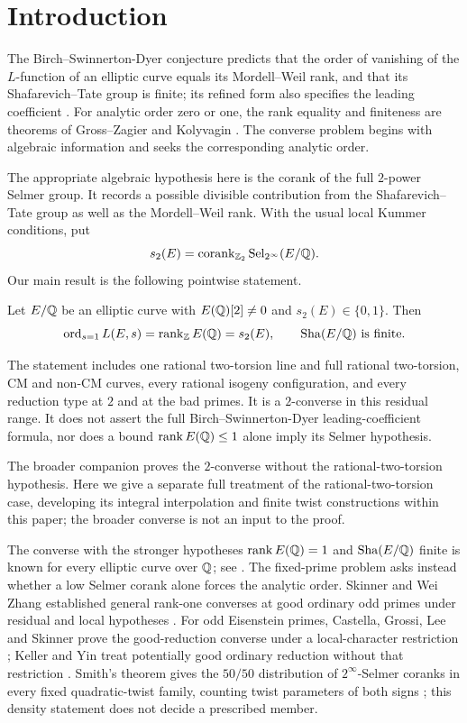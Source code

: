 \section{Introduction}\label{sec:introduction}

The Birch--Swinnerton-Dyer conjecture predicts that the order of vanishing
of the $L$-function of an elliptic curve equals its Mordell--Weil rank,
and that its Shafarevich--Tate group is finite; its refined form also
specifies the leading coefficient \cite{BirchSwinnertonDyer1965,Tate1966}.
For analytic order zero or one, the rank equality and finiteness are
theorems of Gross--Zagier and Kolyvagin
\cite{GrossZagier1986,Kolyvagin1990}.
The converse problem begins with algebraic information and seeks the
corresponding analytic order.

The appropriate algebraic hypothesis here is the corank of the full
$2$-power Selmer group. It records a possible divisible contribution
from the Shafarevich--Tate group as well as the Mordell--Weil rank.
With the usual local Kummer conditions, put
\[
s_2(E)=\operatorname{corank}_{\mathbb Z_2}\operatorname{Sel}_{2^\infty}(E/\mathbb Q).
\]
Our main result is the following pointwise statement.

\begin{theorem}\label{thm:main}
Let $E/\mathbb Q$ be an elliptic curve with $E(\mathbb Q)[2]\ne0$ and
$s_2(E)\in\{0,1\}$. Then
\[
\operatorname{ord}_{s=1}L(E,s)=\operatorname{rank}_{\mathbb Z}E(\mathbb Q)=s_2(E),
\qquad
\operatorname{Sha}(E/\mathbb Q)\text{ is finite}.
\]
\end{theorem}

The statement includes one rational two-torsion line and full rational
two-torsion, CM and non-CM curves, every rational isogeny configuration,
and every reduction type at $2$ and at the bad primes. It is a
$2$-converse in this residual range. It does not assert the full
Birch--Swinnerton-Dyer leading-coefficient formula, nor does a bound
$\operatorname{rank} E(\mathbb Q)\le1$ alone imply its Selmer hypothesis.

The broader companion \cite[Theorem~1.1]{OpenAIGoldfeldTwoConverse2026}
proves the $2$-converse without the rational-two-torsion hypothesis.
Here we give a separate full treatment of the rational-two-torsion case,
developing its integral interpolation and finite twist constructions
within this paper; the broader converse is not an input to the proof.

The converse with the stronger hypotheses
$\operatorname{rank} E(\mathbb Q)=1$ and $\operatorname{Sha}(E/\mathbb Q)$ finite is known for every
elliptic curve over $\mathbb Q$; see \cite[\S1]{Kim2023SoftConverse}.
The fixed-prime problem asks instead whether a low Selmer corank
alone forces the analytic order. Skinner and Wei Zhang established
general rank-one converses at good ordinary odd primes under residual
and local hypotheses \cite{Skinner2020,Zhang2014Heegner}.
For odd Eisenstein primes, Castella, Grossi, Lee and Skinner prove
the good-reduction converse under a local-character restriction
\cite[Theorem~E]{CGLS2022}; Keller and Yin treat potentially good
ordinary reduction without that restriction
\cite[Theorem~B]{KellerYin2024}. Smith's theorem gives the $50/50$
distribution of $2^\infty$-Selmer coranks in every fixed quadratic-twist
family, counting twist parameters of both signs \cite{Smith2025};
this density statement does not decide a prescribed member.


